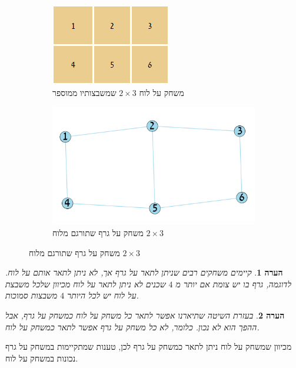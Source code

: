 \documentclass[12pt,leqno]{article}
\theoremstyle{theoremdd}
\newtheorem{comm}{הערה}[section]
\begin{document}
\begin{figure}[ht]
    \caption{
        דוגמה
        למשחק על לוח שתורגם למשחק על גרף
        }
    \begin{subfigure}{.5\textwidth}
        \caption{
            משחק על לוח
            $2 \times 3$
            שמשבצותיו
            ממוספר
        }
        \label{2x3_board}
        \centering
        \includegraphics[scale=.95]{images/2x3_board.PNG}
    \end{subfigure}%
    \begin{subfigure}{.5\textwidth}
        \caption{
            משחק על גרף
            שתורגם מלוח
            $2 \times 3$
        }
        \centering
        \label{2x3_graph}
        \includegraphics[scale=0.8]{images/2x3_graph.png}
    \end{subfigure}%
\end{figure}

\begin{comm}
קיימים משחקים רבים שניתן לתאר על גרף אך, לא ניתן לתאר אותם על לוח.
לדוגמה, גרף בו יש צומת אם יותר מ
$4$
שכנים
לא ניתן לתאר על לוח מכיוון
שלכל
משבצת על לוח
יש לכל היותר
$4$
משבצות סמוכות.
\end{comm}
\begin{comm}
    בעזרת השיטה שתיארנו אפשר לתאר כל משחק על לוח כמשחק על גרף, אבל ההפך הוא לא נכון.
כלומר, לא כל משחק על גרף אפשר לתאר כמשחק על לוח.
\end{comm}
מכיוון שמשחק על לוח ניתן לתאר כמשחק על גרף לכן, טענות שמתקיימות
במשחק על גרף נכונות במשחק על לוח.
\end{document}
